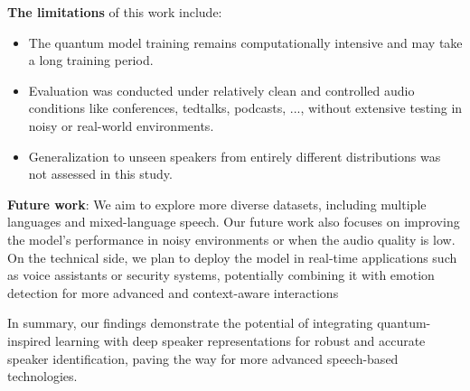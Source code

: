 \documentclass[conference]{IEEEtran}
\begin{document}
\textbf{The limitations} of this work include:
\begin{itemize}
    \item The quantum model training remains computationally intensive and may take a long training period.
    \item Evaluation was conducted under relatively clean and controlled audio conditions like conferences, tedtalks, podcasts, ..., without extensive testing in noisy or real-world environments.
    \item Generalization to unseen speakers from entirely different distributions was not assessed in this study.
\end{itemize}

\textbf{Future work}:
We aim to explore more diverse datasets, including multiple languages and mixed-language speech.
Our future work also focuses on improving the model's performance in noisy environments or when
the audio quality is low. On the technical side, we plan to deploy the model in real-time
applications such as voice assistants or security systems, potentially combining it with
emotion detection for more advanced and context-aware interactions

In summary, our findings demonstrate the potential of integrating quantum-inspired learning with deep speaker representations for robust and accurate speaker identification, paving the way for more advanced speech-based technologies.





\end{document}
